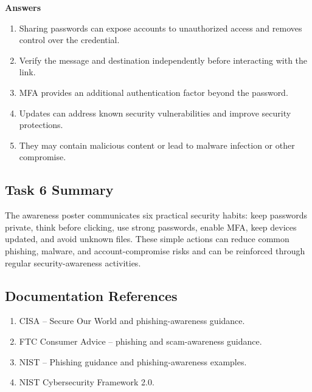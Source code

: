 \documentclass[12pt,a4paper]{article}
\begin{document}
\textbf{Answers}
\begin{enumerate}
    \item Sharing passwords can expose accounts to unauthorized access and removes control over the credential.
    \item Verify the message and destination independently before interacting with the link.
    \item MFA provides an additional authentication factor beyond the password.
    \item Updates can address known security vulnerabilities and improve security protections.
    \item They may contain malicious content or lead to malware infection or other compromise.
\end{enumerate}

\subsection{Task 6 Summary}

The awareness poster communicates six practical security habits: keep passwords private, think before clicking, use strong passwords, enable MFA, keep devices updated, and avoid unknown files. These simple actions can reduce common phishing, malware, and account-compromise risks and can be reinforced through regular security-awareness activities.

\subsection{Documentation References}

\begin{enumerate}
    \item CISA -- Secure Our World and phishing-awareness guidance.
    \item FTC Consumer Advice -- phishing and scam-awareness guidance.
    \item NIST -- Phishing guidance and phishing-awareness examples.
    \item NIST Cybersecurity Framework 2.0.
\end{enumerate}
\end{document}
